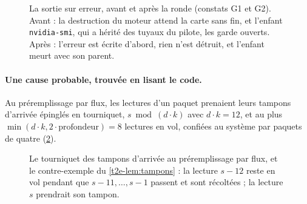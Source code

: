 \begin{figure}[ht]
\centering
\SchemaResSortie
\caption[La sortie sur erreur, avant et après la ronde]{La sortie sur erreur, avant et après la ronde (constats G1 et G2). Avant : la destruction du moteur attend la carte sans fin, et l'enfant \texttt{nvidia-smi}, qui a hérité des tuyaux du pilote, les garde ouverts. Après : l'erreur est écrite d'abord, rien n'est détruit, et l'enfant meurt avec son parent.}
\label{t2e-fig:sortie}
\end{figure}

\paragraph{Une cause probable, trouvée en lisant le code.} Au préremplissage par flux, les lectures d'un paquet prenaient leurs tampons d'arrivée épinglés en tourniquet, $s \bmod (d \cdot k)$ avec $d \cdot k = 12$, et au plus $\min(d\cdot k, 2 \cdot \text{profondeur}) = 8$ lectures en vol, confiées au système par paquets de quatre (\cref{t2e-fig:tampons}).

\begin{figure}[ht]
\centering
\SchemaResTampons
\caption[Le tourniquet des tampons d'arrivée]{Le tourniquet des tampons d'arrivée au préremplissage par flux, et le contre-exemple du \cref{t2e-lem:tampons} : la lecture $s-12$ reste en vol pendant que $s-11, \dots, s-1$ passent et sont récoltées ; la lecture $s$ prendrait son tampon.}
\label{t2e-fig:tampons}
\end{figure}

